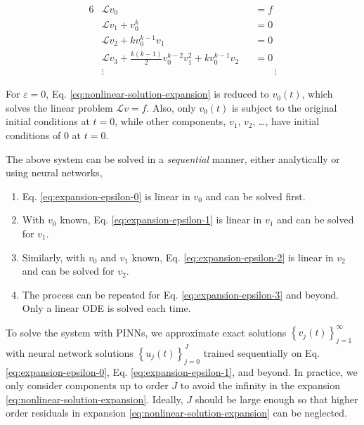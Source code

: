 \documentclass[accepted]{uai2023}
\renewcommand{\L}{\mathcal{L}}
\begin{document}
    {
        \small
        \begin{alignat}{6}
            &\L v_0 &&= f \label{eq:expansion-epsilon-0}\\
            &\L v_1 + v_0^k &&= 0 \label{eq:expansion-epsilon-1}\\
            &\L v_2 + k v_0^{k-1}v_1 &&= 0 \label{eq:expansion-epsilon-2} \\
            &\L v_3 + \frac{k(k-1)}{2} v_0^{k-2}v_1^2 + k v_0^{k-1}v_2 &&= 0 \label{eq:expansion-epsilon-3} \\[-1em]
            &\vdots &&\phantom{=}\,\,\,\,\vdots\nonumber
        \end{alignat}
    }

    \vspace{-1em}
    For $\varepsilon = 0$, Eq. \ref{eq:nonlinear-solution-expansion} is reduced to $v_0(t)$, which solves the linear problem $\L v=f$. 
    Also, only $v_0(t)$ is subject to the original initial conditions at $t=0$, while other components, $v_1$, $v_2$, \dots, have initial conditions of $0$ at $t=0$.

    The above system can be solved in a \textit{sequential} manner, either analytically or using neural networks,
    \begin{enumerate}
        \item Eq. \ref{eq:expansion-epsilon-0} is linear in $v_0$ and can be solved first. 
        \item With $v_0$ known, Eq. \ref{eq:expansion-epsilon-1} is linear in $v_1$ and can be solved for $v_1$. 
        \item Similarly, with $v_0$ and $v_1$ known, Eq. \ref{eq:expansion-epsilon-2} is linear in $v_2$ and can be solved for $v_2$.
        \item The process can be repeated for Eq. \ref{eq:expansion-epsilon-3} and beyond. Only a linear ODE is solved each time.
    \end{enumerate}
    To solve the system with PINNs, we approximate exact solutions $\left\{v_j(t)\right\}_{j=1}^{\infty}$ with neural network solutions $\left\{u_j(t)\right\}_{j=0}^{J}$ trained sequentially on Eq. \ref{eq:expansion-epsilon-0}, Eq. \ref{eq:expansion-epsilon-1}, and beyond. 
    In practice, we only consider components up to order $J$ to avoid the infinity in the expansion \ref{eq:nonlinear-solution-expansion}. 
    Ideally, $J$ should be large enough so that higher order residuals in expansion \ref{eq:nonlinear-solution-expansion} can be neglected.
\end{document}
